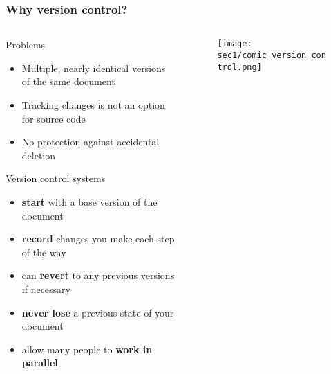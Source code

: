 \begin{frame}[fragile]
\frametitle{Why version control?}

  \begin{columns}

    \begin{column}{0.6\textwidth}
      Problems
      \begin{itemize}
        \small
        \item Multiple, nearly identical versions of the same document
        \item Tracking changes is not an option for source code
        \item No protection against accidental deletion
      \end{itemize}
      \vspace{0.15cm}
      Version control systems 
      \begin{itemize}
        \small
        \item {\bf start} with a base version of the document
        \item {\bf record} changes you make each step of the way
        \item can {\bf revert} to any previous versions if necessary
        \item {\bf never lose} a previous state of your document
        \item allow many people to {\bf work in parallel}
      \end{itemize}
    \end{column}

    \begin{column}{0.4\textwidth}
    \begin{figure}[h]
    \texttt{[image: sec1/comic\_version\_control.png]}
    \end{figure}
    \end{column}

  \end{columns}

\end{frame}

